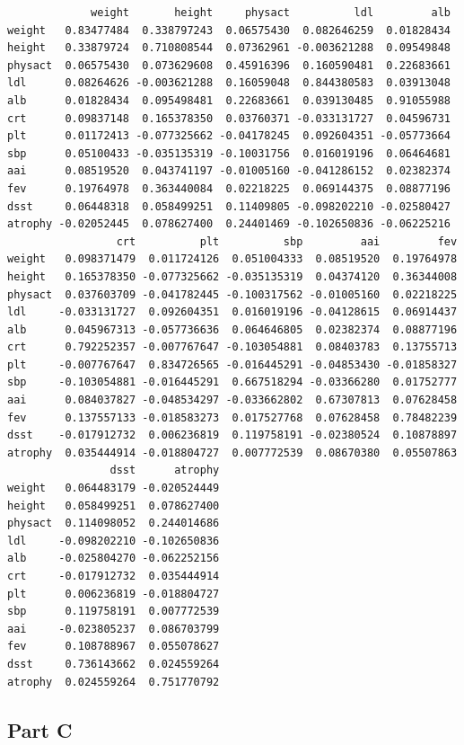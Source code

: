 \documentclass[
  letterpaper,
  DIV=11,
  numbers=noendperiod]{scrartcl}
\begin{document}
\begin{verbatim}
             weight       height     physact          ldl         alb
weight   0.83477484  0.338797243  0.06575430  0.082646259  0.01828434
height   0.33879724  0.710808544  0.07362961 -0.003621288  0.09549848
physact  0.06575430  0.073629608  0.45916396  0.160590481  0.22683661
ldl      0.08264626 -0.003621288  0.16059048  0.844380583  0.03913048
alb      0.01828434  0.095498481  0.22683661  0.039130485  0.91055988
crt      0.09837148  0.165378350  0.03760371 -0.033131727  0.04596731
plt      0.01172413 -0.077325662 -0.04178245  0.092604351 -0.05773664
sbp      0.05100433 -0.035135319 -0.10031756  0.016019196  0.06464681
aai      0.08519520  0.043741197 -0.01005160 -0.041286152  0.02382374
fev      0.19764978  0.363440084  0.02218225  0.069144375  0.08877196
dsst     0.06448318  0.058499251  0.11409805 -0.098202210 -0.02580427
atrophy -0.02052445  0.078627400  0.24401469 -0.102650836 -0.06225216
                 crt          plt          sbp         aai         fev
weight   0.098371479  0.011724126  0.051004333  0.08519520  0.19764978
height   0.165378350 -0.077325662 -0.035135319  0.04374120  0.36344008
physact  0.037603709 -0.041782445 -0.100317562 -0.01005160  0.02218225
ldl     -0.033131727  0.092604351  0.016019196 -0.04128615  0.06914437
alb      0.045967313 -0.057736636  0.064646805  0.02382374  0.08877196
crt      0.792252357 -0.007767647 -0.103054881  0.08403783  0.13755713
plt     -0.007767647  0.834726565 -0.016445291 -0.04853430 -0.01858327
sbp     -0.103054881 -0.016445291  0.667518294 -0.03366280  0.01752777
aai      0.084037827 -0.048534297 -0.033662802  0.67307813  0.07628458
fev      0.137557133 -0.018583273  0.017527768  0.07628458  0.78482239
dsst    -0.017912732  0.006236819  0.119758191 -0.02380524  0.10878897
atrophy  0.035444914 -0.018804727  0.007772539  0.08670380  0.05507863
                dsst      atrophy
weight   0.064483179 -0.020524449
height   0.058499251  0.078627400
physact  0.114098052  0.244014686
ldl     -0.098202210 -0.102650836
alb     -0.025804270 -0.062252156
crt     -0.017912732  0.035444914
plt      0.006236819 -0.018804727
sbp      0.119758191  0.007772539
aai     -0.023805237  0.086703799
fev      0.108788967  0.055078627
dsst     0.736143662  0.024559264
atrophy  0.024559264  0.751770792
\end{verbatim}

\newpage{}

\hypertarget{part-c}{%
\subsection{Part C}\label{part-c}}
\end{document}

